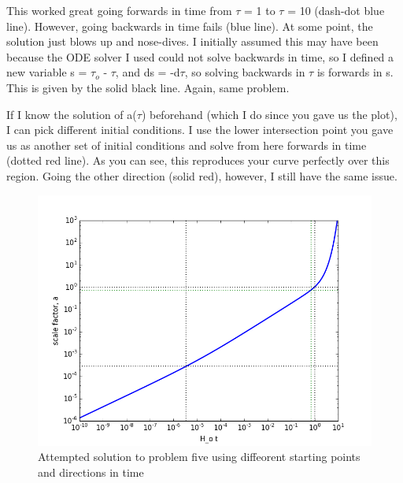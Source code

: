 \documentclass[12pt]{article}%
\begin{document}
\begin{flushleft}
This worked great going forwards in time from $\tau$ = 1 to $\tau$ = 10 (dash-dot blue line). However, going backwards in time fails (blue line). At some point, the solution just blows up and nose-dives. I initially assumed this may have been because the ODE solver I used could not solve backwards in time, so I defined a new variable s = $\tau_o$ - $\tau$, and ds = -d$\tau$, so solving backwards in $\tau$ is forwards in s. This is given by the solid black line. Again, same problem. 

If I know the solution of a($\tau$) beforehand (which I do since you gave us the plot), I can pick different initial conditions. I use the lower intersection point you gave us as another set of initial conditions and solve from here forwards in time (dotted red line). As you can see, this reproduces your curve perfectly over this region. Going the other direction (solid red), however, I still have the same issue. 


\begin{figure}[t]
\center
\includegraphics[width=0.9\linewidth]{p5}
\caption{Attempted solution to problem five using diffeorent starting points and directions in time}
\label{fig:p5}
\end{figure}


\

\end{flushleft}
\end{document}
